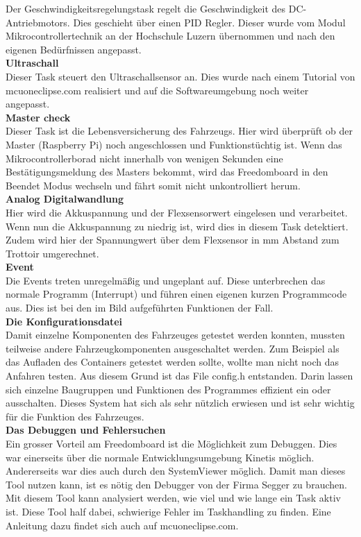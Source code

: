 Der Geschwindigkeitsregelungstask regelt die Geschwindigkeit des DC-Antriebmotors. Dies geschieht über einen PID Regler. Dieser wurde vom Modul Mikrocontrollertechnik an der Hochschule Luzern übernommen und nach den eigenen Bedürfnissen angepasst.\\[0.2cm]
\textbf{Ultraschall}\\[0.2cm]
Dieser Task steuert den Ultraschallsensor an. Dies wurde nach einem Tutorial von mcuoneclipse.com realisiert und auf die Softwareumgebung noch weiter angepasst.\\[0.2cm]
\textbf{Master check}\\[0.2cm]
Dieser Task ist die Lebensversicherung des Fahrzeugs. Hier wird überprüft ob der Master (Raspberry Pi) noch angeschlossen und Funktionstüchtig ist. Wenn das Mikrocontrollerborad nicht innerhalb von wenigen Sekunden eine Bestätigungsmeldung des Masters bekommt, wird das Freedomboard in den Beendet Modus wechseln und fährt somit nicht unkontrolliert herum. \\[0.2cm]
\textbf{Analog Digitalwandlung}\\[0.2cm]
Hier wird die Akkuspannung und der Flexsensorwert eingelesen und verarbeitet. Wenn nun die Akkuspannung zu niedrig ist, wird dies in diesem Task detektiert. Zudem wird hier der Spannungwert über dem Flexsensor in mm Abstand zum Trottoir umgerechnet.\\[0.2cm]
\textbf{Event}\\[0.2cm]
Die Events treten unregelmäßig und ungeplant auf. Diese unterbrechen das normale Programm (Interrupt) und führen einen eigenen kurzen Programmcode aus. Dies ist bei den im Bild aufgeführten Funktionen der Fall.\\[0.2cm]
\textbf{Die Konfigurationsdatei}\\[0.2cm]
Damit einzelne Komponenten des Fahrzeuges getestet werden konnten, mussten teilweise andere Fahrzeugkomponenten ausgeschaltet werden. Zum Beispiel als das Aufladen des Containers getestet werden sollte, wollte man nicht noch das Anfahren testen. Aus diesem Grund ist das File config.h entstanden. Darin lassen sich einzelne Baugruppen und Funktionen des Programmes effizient ein oder ausschalten. Dieses System hat sich als sehr nützlich erwiesen und ist sehr wichtig für die Funktion des Fahrzeuges.\\[0.2cm]
\textbf{Das Debuggen und Fehlersuchen}\\[0.2cm]
Ein grosser Vorteil am Freedomboard ist die Möglichkeit zum Debuggen. Dies war einerseits über die normale Entwicklungsumgebung Kinetis möglich. Andererseits war dies auch durch den SystemViewer möglich. Damit man dieses Tool nutzen kann, ist es nötig den Debugger von der Firma Segger zu brauchen. Mit diesem Tool kann analysiert werden, wie viel und wie lange ein Task aktiv ist. Diese Tool half dabei, schwierige Fehler im Taskhandling zu finden. Eine Anleitung dazu findet sich auch auf mcuoneclipse.com.\\[0.2cm]
